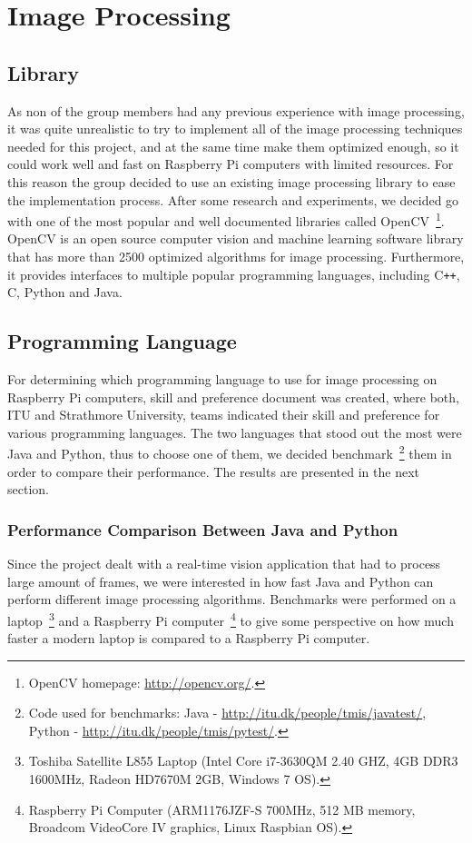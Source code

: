 \section{Image Processing}


\subsection{Library}
As non of the group members had any previous experience with image processing, it was quite unrealistic to try to implement all of the image processing techniques needed for this project, and at the same time make them optimized enough, so it could work well and fast on Raspberry Pi computers with limited resources. For this reason the group decided to use an existing image processing library to ease the implementation process. After some research and experiments, we decided go with one of the most popular and well documented libraries called OpenCV~\footnote{OpenCV homepage: \url{http://opencv.org/}.}. OpenCV is an open source computer vision and machine learning software library that has more than 2500 optimized algorithms for image processing. Furthermore, it provides interfaces to multiple popular programming languages, including C\texttt{++}, C, Python and Java.

\subsection{Programming Language}
For determining which programming language to use for image processing on Raspberry Pi computers, skill and preference document was created, where both, ITU and Strathmore University, teams indicated their skill and preference for various programming languages. The two languages that stood out the most were Java and Python, thus to choose one of them, we decided benchmark~\footnote{Code used for benchmarks: Java - \url{http://itu.dk/people/tmis/javatest/}, Python - \url{http://itu.dk/people/tmis/pytest/}.} them in order to compare their performance. The results are presented in the next section.

\subsubsection{Performance Comparison Between Java and Python}
Since the project dealt with a real-time vision application that had to process large amount of frames, we were interested in how fast Java and Python can perform different image processing algorithms. Benchmarks were performed on a laptop~\footnote{Toshiba Satellite L855 Laptop (Intel Core i7-3630QM 2.40 GHZ, 4GB DDR3 1600MHz, Radeon HD7670M 2GB, Windows 7 OS).} and a Raspberry Pi computer~\footnote{Raspberry Pi Computer (ARM1176JZF-S 700MHz, 512 MB memory, Broadcom VideoCore IV graphics, Linux Raspbian OS).} to give some perspective on how much faster a modern laptop is compared to a Raspberry Pi computer.

